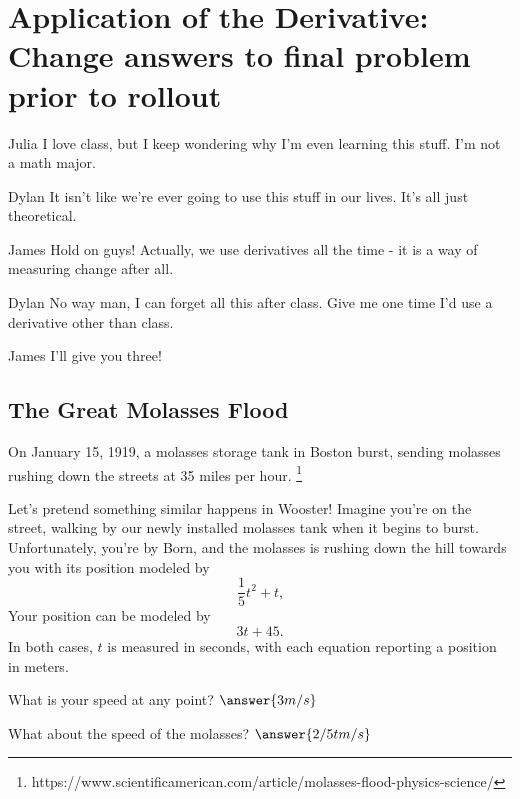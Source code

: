 \documentclass[handout]{ximera}
\begin{document}
\section{Application of the Derivative: Change answers to final problem prior to rollout}
\begin{dialogue}
\item[Julia] I love class, but I keep wondering why I'm even learning this stuff. I'm not a math major.
\item[Dylan] It isn't like we're ever going to use this stuff in our lives. It's all just theoretical.
\item[James] Hold on guys! Actually, we use derivatives all the time - it is a way of measuring change after all.
\item[Dylan] No way man, I can forget all this after class. Give me one time I'd use a derivative other than class.
\item[James] I'll give you three!
\end{dialogue}
\subsection{The Great Molasses Flood}
On January 15, 1919, a molasses storage tank in Boston burst, sending molasses rushing down the streets at 35 miles per hour. \footnote{https://www.scientificamerican.com/article/molasses-flood-physics-science/}

Let's pretend something similar happens in Wooster! Imagine you're on the street, walking by our newly installed molasses tank when it begins to burst. Unfortunately, you're by Born, and the molasses is rushing down the hill towards you with its position modeled by $$\frac{1}{5}t^2+t \text{,}$$ Your position can be modeled by $$3t+45 \text{.}$$ In both cases, $t$ is measured in seconds, with each equation reporting a position in meters.

\setcounter{problem}{0}
\begin{question}
What is your speed at any point?  $\answer{3 m/s}$

What about the speed of the molasses? $\answer{2/5 t m/s}$
\end{question}
\end{document}
